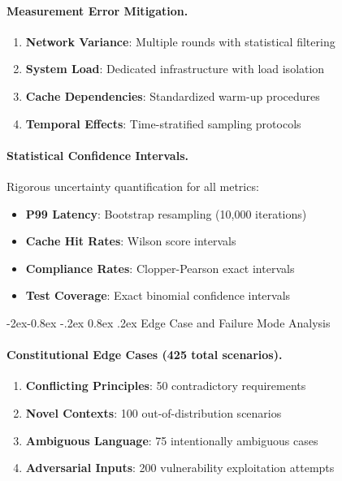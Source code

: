 \documentclass[manuscript,screen,9pt]{acmart}
\makeatletter
\renewcommand\subsubsection{\@startsection{subsubsection}{3}{\z@}%
  {-2ex\@plus -0.8ex \@minus -.2ex}%
  {0.8ex \@plus .2ex}%
  {\normalfont\normalsize\bfseries}}
\makeatother
\begin{document}
\begin{table}[!htb]
\paragraph{Measurement Error Mitigation.}
\begin{enumerate}[leftmargin=*,itemsep=1pt,parsep=1pt]
    \item \textbf{Network Variance}: Multiple rounds with statistical filtering
    \item \textbf{System Load}: Dedicated infrastructure with load isolation
    \item \textbf{Cache Dependencies}: Standardized warm-up procedures
    \item \textbf{Temporal Effects}: Time-stratified sampling protocols
\end{enumerate}

\paragraph{Statistical Confidence Intervals.}
Rigorous uncertainty quantification for all metrics:
\begin{itemize}[leftmargin=*,itemsep=1pt,parsep=1pt]
    \item \textbf{P99 Latency}: Bootstrap resampling (10,000 iterations)
    \item \textbf{Cache Hit Rates}: Wilson score intervals
    \item \textbf{Compliance Rates}: Clopper-Pearson exact intervals
    \item \textbf{Test Coverage}: Exact binomial confidence intervals
\end{itemize}

\subsubsection{Edge Case and Failure Mode Analysis}
\label{subsubsec:edge_case_analysis}

\paragraph{Constitutional Edge Cases (425 total scenarios).}
\begin{enumerate}[leftmargin=*,itemsep=1pt,parsep=1pt]
    \item \textbf{Conflicting Principles}: 50 contradictory requirements
    \item \textbf{Novel Contexts}: 100 out-of-distribution scenarios
    \item \textbf{Ambiguous Language}: 75 intentionally ambiguous cases
    \item \textbf{Adversarial Inputs}: 200 vulnerability exploitation attempts
\end{enumerate}


\end{table}
\end{document}
